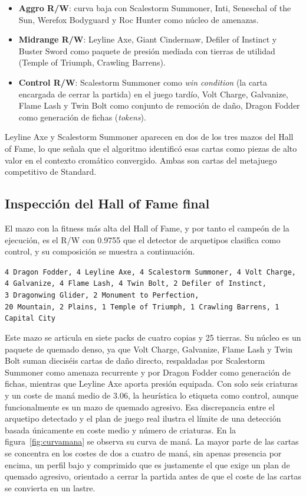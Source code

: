 \begin{itemize}
    \item \textbf{Aggro R/W}: curva baja con Scalestorm Summoner, Inti, Seneschal of the Sun, Werefox Bodyguard y Roc Hunter como núcleo de amenazas.
    \item \textbf{Midrange R/W}: Leyline Axe, Giant Cindermaw, Defiler of Instinct y Buster Sword como paquete de presión mediada con tierras de utilidad (Temple of Triumph, Crawling Barrens).
    \item \textbf{Control R/W}: Scalestorm Summoner como \emph{win condition} (la carta encargada de cerrar la partida) en el juego tardío, Volt Charge, Galvanize, Flame Lash y Twin Bolt como conjunto de remoción de daño, Dragon Fodder como generación de fichas (\emph{tokens}).
\end{itemize}

Leyline Axe y Scalestorm Summoner aparecen en dos de los tres mazos del Hall of Fame, lo que señala que el algoritmo identificó esas cartas como piezas de alto valor en el contexto cromático convergido. Ambas son cartas del metajuego competitivo de Standard.

\subsection{Inspección del Hall of Fame final}

El mazo con la fitness más alta del Hall of Fame, y por tanto el campeón de la ejecución, es el R/W con 0.9755 que el detector de arquetipos clasifica como control, y su composición se muestra a continuación.

\begin{center}
\small
\texttt{4 Dragon Fodder, 4 Leyline Axe, 4 Scalestorm Summoner, 4 Volt Charge,}\\
\texttt{4 Galvanize, 4 Flame Lash, 4 Twin Bolt, 2 Defiler of Instinct,}\\
\texttt{3 Dragonwing Glider, 2 Monument to Perfection,}\\
\texttt{20 Mountain, 2 Plains, 1 Temple of Triumph, 1 Crawling Barrens, 1 Capital City}
\end{center}

Este mazo se articula en siete packs de cuatro copias y 25 tierras. Su núcleo es un paquete de quemado denso, ya que Volt Charge, Galvanize, Flame Lash y Twin Bolt suman dieciséis cartas de daño directo, respaldadas por Scalestorm Summoner como amenaza recurrente y por Dragon Fodder como generación de fichas, mientras que Leyline Axe aporta presión equipada. Con solo seis criaturas y un coste de maná medio de 3.06, la heurística lo etiqueta como control, aunque funcionalmente es un mazo de quemado agresivo. Esa discrepancia entre el arquetipo detectado y el plan de juego real ilustra el límite de una detección basada únicamente en coste medio y número de criaturas. En la figura~\ref{fig:curvamana} se observa su curva de maná. La mayor parte de las cartas se concentra en los costes de dos a cuatro de maná, sin apenas presencia por encima, un perfil bajo y comprimido que es justamente el que exige un plan de quemado agresivo, orientado a cerrar la partida antes de que el coste de las cartas se convierta en un lastre.

